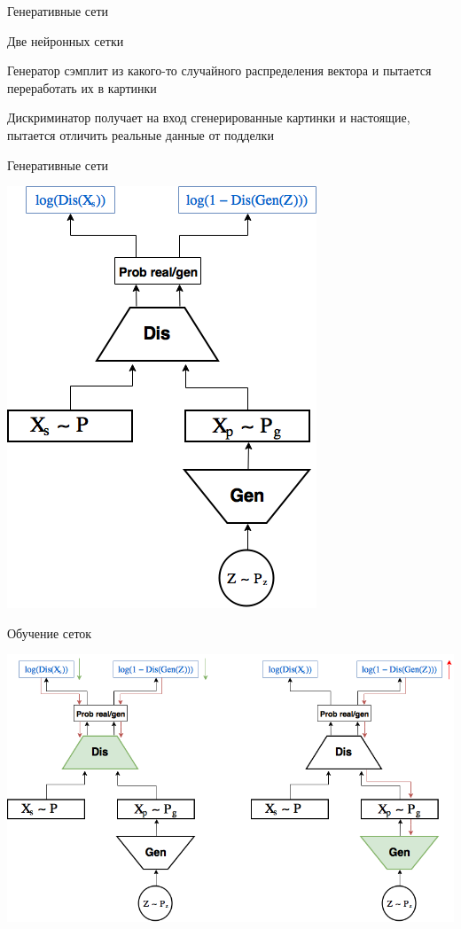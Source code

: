 \documentclass[notes,12pt, aspectratio=169]{beamer}
\newenvironment{wideitemize}{\itemize\addtolength{\itemsep}{10pt}}{\enditemize}
\begin{document}
\begin{frame}{Генеративные сети}
\begin{wideitemize}
	\item   Две нейронных сетки 
	\item   \alert{Генератор}  сэмплит из какого-то случайного распределения вектора и пытается переработать их в картинки 
	\item   \alert{Дискриминатор}  получает на вход сгенерированные картинки и настоящие, пытается отличить реальные данные от подделки   
\end{wideitemize}
\end{frame}


\begin{frame}{Генеративные сети}
\begin{center}
	\includegraphics[width=.35\linewidth]{gan_1.png}
\end{center}
\end{frame}


\begin{frame}{Обучение сеток}
\begin{center}
	\includegraphics[width=.8\linewidth]{gan_2.png}
\end{center}
\end{frame}
\end{document}

